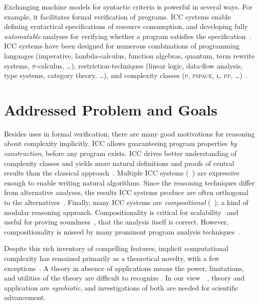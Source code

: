 Exchanging machine models for syntactic criteria is powerful in several ways.
For example, it facilitates formal verification of programs.
ICC systems enable defining syntactical specifications of resource consumption, and developing fully \emph{automatable} analyses for verifying whether a program satisfies the specification~\cite{heraud2011}.
ICC systems have been designed for numerous combinations of programming languages (imperative,  lambda-calculus, function algebras, quantum, term rewrite systems, \(\pi\)-calculus, \ldots), restriction-techniques (linear logic, data-flow analysis, type systems, category theory, \ldots), and complexity classes (\textsc{p}, \textsc{pspace}, \textsc{l}, \textsc{pp}, \ldots)~\cite{moyen2017,pchoux2020}.

\section{Addressed Problem and Goals}
\label{sec:aicc-goals}

Besides uses in formal verification, there are many good motivations for reasoning about complexity implicitly.
ICC allows guaranteeing program properties \emph{by construction}, before any program exists.
ICC drives better understanding of complexity classes and yields more natural definitions and proofs of central results than the classical approach~\cite{kristiansen2017}.
Multiple ICC systems (\eg~\cite{jones2009,marion2011}) are expressive enough to enable writing {natural} algorithms.
Since the reasoning techniques differ from alternative analyses, the results ICC systems produce are often orthogonal to the alternatives~\cite{aubert20222}.
Finally, many ICC systems are \emph{compositional} (\eg~\cite{jones2009,marion2011,hainry2023,atkey2024}); a kind of modular reasoning approach.
Compositionality is critical for scalability~\cite{carbonneaux2015} and useful for proving soundness~\cite{keidel2021}, \ie that the analysis itself is correct.
However, compositionality is missed by many prominent program analysis techniques~\cite{carbonneaux2015}.

Despite this rich inventory of compelling features, implicit computational complexity has remained primarily as a theoretical novelty, with a few exceptions~\cite{avanzini2017,avanzini2008,moyen20172,hainry2021,hoffmann2012,feree2018}.
A theory in absence of applications means the power, limitations, and utilities of the theory are difficult to recognize%
.
In our view~\cite[pg. xxxv]{bishop2003}~\cite[p. 75]{moyen2017}, theory and application are \emph{symbiotic}, and investigations of both are needed for scientific advancement.

